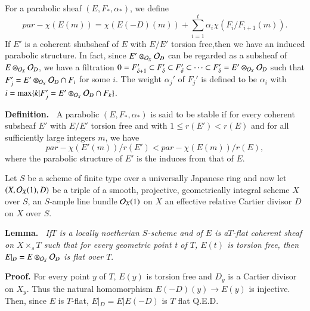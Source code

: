For a parabolic sheaf $(E, F_{*}, \alpha_{*})$, we define
$$
par-\chi(E(m))= \chi(E(-D)(m)) + \sum\limits_{i=1}^{t} \alpha_{i}\chi(F_{i}/F_{i+1}(m)).
$$ 
If $E'$ is a coherent shubsheaf of $E$ with $E/E'$ torsion free,then we have an induced parabolic structure. In fact, since $E'\otimes_{\mathcal{O}_{X}}\mathcal{O}_{D}$ can be regarded as a subsheaf of $E\otimes_{\mathcal{O}_{X}}\mathcal{O}_{D}$, we have a filtration $0 =F_{\delta+1}' \subset F_{\delta}' \subset F_{\delta}' \subset \cdots\subset F_{\delta}'=E' \otimes_{\mathcal{O}_{X}}\mathcal{O}_{D}$ such that $F_{j}' = E'\otimes_{\mathcal{O}_{X}} \mathcal{O}_{D} \cap F_{i}$ for some $i$. The weight $\alpha_{j}'$ of $F_{j}'$ is defined to be $\alpha_{i}$ with $i=\max\{k | F_{j}' =E'\otimes_{\mathcal{O}_{X}}\mathcal{O}_{D} \cap F_{k}\}$.

\medskip
\noindent
{\bfseries {} Definition. \label{art12-definition-2.2}}~A parabolic $(E, F_{*}, \alpha_{*})$ is said to be stable if for every coherent subsheaf $E'$ with $E/E'$ torsion free and with $1 \leq r(E')< r(E)$ and for all sufficiently large integers $m$, we have
$$
par-\chi(E'(m))/r(E') < par-\chi(E(m))/r(E),
$$
where the parabolic structure of $E'$ is the induces from that of $E$.

Let $S$ be a scheme of finite type over a universally Japanese ring and now let $(X, \mathcal{O}_{X}(1),D)$ be a triple of a smooth, projective, geometrically integral scheme $X$ over $S$, an $S$-ample line bundle $\mathcal{O}_{X}(1)$ on $X$ an effective relative Cartier divisor $D$ on $X$ over $S$.

\medskip
\noindent
{\bfseries {} Lemma. \label{art12-Lemma-2.3}}~\textit{If\pageoriginale $T$ is a locally noetherian $S$-scheme and of $E$ is a$T$-flat coherent sheaf on $X \times_{s}T$ such that for every geometric point t of $T$, $E(t)$ is torsion free, then $E|_{D}=E\otimes_{\mathcal{O}_{X}}\mathcal{O}_{D}$ is flat over $T$}.

\medskip
\noindent
{\bfseries Proof.} For every point $y$ of $T$, $E(y)$ is torsion free and $D_{y}$ is a Cartier divisor on $X_{y}$. Thus the natural homomorphism $E(-D)(y)\rightarrow E(y)$ is injective. Then, since $E$ is $T$-flat, $E|_{D}=E|E(-D)$ is $T$ flat \hfill Q.E.D.

